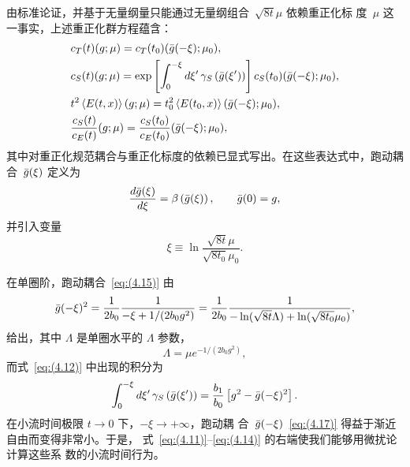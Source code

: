 由标准论证，并基于无量纲量只能通过无量纲组合~$\sqrt{8t}\mu$ 依赖重正化标
度~$\mu$ 这一事实，上述重正化群方程蕴含：
\begin{align}
   &c_T(t)(g;\mu)=c_T(t_0)(\Bar{g}(-\xi);\mu_0),
\label{eq:(4.11)}
\\
   &c_S(t)(g;\mu)
   =\exp\left[\int_0^{-\xi}d\xi'\,\gamma_S\left(\Bar{g}(\xi')\right)\right]
   c_S(t_0)(\Bar{g}(-\xi);\mu_0),
\label{eq:(4.12)}
\\
   &t^2\left\langle E(t,x)\right\rangle(g;\mu)
   =t_0^2\left\langle E(t_0,x)\right\rangle(\Bar{g}(-\xi);\mu_0),
\label{eq:(4.13)}
\\
   &\frac{c_S(t)}{c_E(t)}(g;\mu)=\frac{c_S(t_0)}{c_E(t_0)}(\Bar{g}(-\xi);\mu_0),
\label{eq:(4.14)}
\end{align}
其中对重正化规范耦合与重正化标度的依赖已显式写出。在这些表达式中，跑动耦
合~$\Bar{g}(\xi)$ 定义为
\begin{equation}
   \frac{d\Bar{g}(\xi)}{d\xi}=\beta\left(\Bar{g}(\xi)\right),\qquad
   \Bar{g}(0)=g,
\label{eq:(4.15)}
\end{equation}
并引入变量
\begin{equation}
   \xi\equiv\ln\frac{\sqrt{8t}\mu}{\sqrt{8t_0}\mu_0}.
\label{eq:(4.16)}
\end{equation}

在单圈阶，跑动耦合~\eqref{eq:(4.15)} 由
\begin{equation}
   \Bar{g}(-\xi)^2=\frac{1}{2b_0}\frac{1}{-\xi+1/(2b_0g^2)}
   =\frac{1}{2b_0}\frac{1}{-\ln(\sqrt{8t}\Lambda)+\ln(\sqrt{8t_0}\mu_0)},
\label{eq:(4.17)}
\end{equation}
给出，其中 $\Lambda$ 是单圈水平的 $\Lambda$ 参数，
\begin{equation}
   \Lambda=\mu e^{-1/(2b_0g^2)},
\label{eq:(4.18)}
\end{equation}
而式~\eqref{eq:(4.12)} 中出现的积分为
\begin{equation}
   \int_0^{-\xi}d\xi'\,
   \gamma_S\left(\Bar{g}(\xi')\right)
   =\frac{b_1}{b_0}
   \left[
   g^2-\Bar{g}(-\xi)^2
   \right].
\label{eq:(4.19)}
\end{equation}
在小流时间极限 $t\to0$ 下，$-\xi\to+\infty$，跑动耦
合~$\Bar{g}(-\xi)$~\eqref{eq:(4.17)} 得益于渐近自由而变得非常小。于是，
式~\eqref{eq:(4.11)}--\eqref{eq:(4.14)} 的右端使我们能够用微扰论计算这些系
数的小流时间行为。

